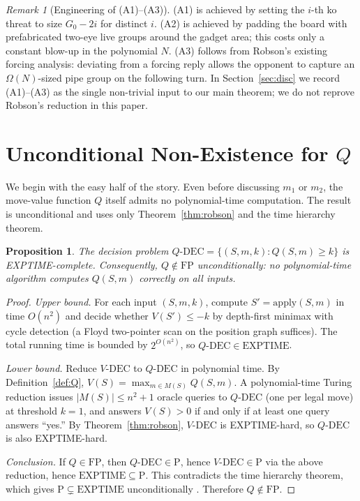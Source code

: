 \documentclass[11pt,a4paper]{amsart}
\theoremstyle{plain}
\newtheorem{proposition}[theorem]{Proposition}
\theoremstyle{definition}
\theoremstyle{remark}
\newtheorem{remark}[theorem]{Remark}
\newcommand{\FP}{\mathrm{FP}}
\newcommand{\PTIME}{\mathrm{P}}
\newcommand{\EXPTIME}{\mathrm{EXPTIME}}
\newcommand{\Apply}{\mathrm{apply}}
\begin{document}
\begin{remark}[Engineering of (A1)--(A3)]
\label{rem:A123}
(A1) is achieved by setting the $i$-th ko threat to size
$G_0 - 2i$ for distinct $i$. (A2) is achieved by padding the board
with prefabricated two-eye live groups around the gadget area; this
costs only a constant blow-up in the polynomial $N$. (A3) follows from
Robson's existing forcing analysis: deviating from a forcing reply
allows the opponent to capture an $\Omega(N)$-sized pipe group on the
following turn. In Section~\ref{sec:disc} we record (A1)--(A3) as the
single non-trivial input to our main theorem; we do not reprove
Robson's reduction in this paper.
\end{remark}

\section{Unconditional Non-Existence for $Q$}
\label{sec:Q}

We begin with the easy half of the story. Even before discussing
$m_1$ or $m_2$, the move-value function $Q$ itself admits no
polynomial-time computation. The result is unconditional and uses
only Theorem~\ref{thm:robson} and the time hierarchy theorem.

\begin{proposition}
\label{prop:Q-not-FP}
The decision problem
$Q\text{-DEC} = \{(S,m,k) : Q(S,m) \geq k\}$
is EXPTIME-complete. Consequently, $Q \notin \FP$ unconditionally:
no polynomial-time algorithm computes $Q(S,m)$ correctly on all
inputs.
\end{proposition}

\begin{proof}
\emph{Upper bound.} For each input $(S, m, k)$, compute
$S' = \Apply(S, m)$ in time $O(n^2)$ and decide whether $V(S') \leq -k$
by depth-first minimax with cycle detection (a Floyd two-pointer scan
on the position graph suffices). The total running time is bounded by
$2^{O(n^2)}$, so $Q\text{-DEC} \in \EXPTIME$.

\emph{Lower bound.} Reduce $V\text{-DEC}$ to $Q\text{-DEC}$ in
polynomial time. By Definition~\ref{def:Q},
$V(S) = \max_{m \in M(S)} Q(S, m)$. A polynomial-time Turing reduction
issues $|M(S)| \leq n^2 + 1$ oracle queries to $Q\text{-DEC}$
(one per legal move) at threshold $k = 1$, and answers
$V(S) > 0$ if and only if at least one query answers ``yes.''
By Theorem~\ref{thm:robson}, $V\text{-DEC}$ is EXPTIME-hard, so
$Q\text{-DEC}$ is also EXPTIME-hard.

\emph{Conclusion.} If $Q \in \FP$, then $Q\text{-DEC} \in \PTIME$,
hence $V\text{-DEC} \in \PTIME$ via the above reduction, hence
$\EXPTIME \subseteq \PTIME$. This contradicts the time hierarchy
theorem, which gives $\PTIME \subsetneq \EXPTIME$ unconditionally
\cite{HS65}. Therefore $Q \notin \FP$.
\end{proof}
\end{document}
